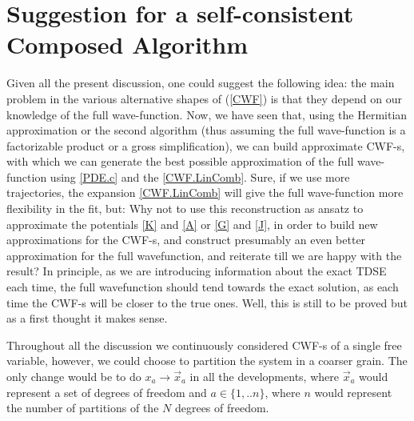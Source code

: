 \documentclass[11pt, a4paper]{article} %
\begin{document}
\newpage
\section{Suggestion for a self-consistent Composed Algorithm}
Given all the present discussion, one could suggest the following idea: the main problem in the various alternative shapes of (\ref{CWF}) is that they depend on our knowledge of the full wave-function. Now, we have seen that, using the Hermitian approximation or the second algorithm (thus assuming the full wave-function is a factorizable product or a gross simplification), we can build approximate CWF-s, with which we can generate the best possible approximation of the full wave-function using \ref{PDE.c} and the \ref{CWF.LinComb}. Sure, if we use more trajectories, the expansion \ref{CWF.LinComb} will give the full wave-function more flexibility in the fit, but: Why not to use this reconstruction as ansatz to approximate the potentials \ref{K} and \ref{A} or \ref{G} and \ref{J}, in order to build new approximations for the CWF-s, and construct presumably an even better approximation for the full wavefunction, and reiterate till we are happy with the result? In principle, as we are introducing information about the exact TDSE each time, the full wavefunction should tend towards the exact solution, as each time the CWF-s will be closer to the true ones. Well, this is still to be proved but as a first thought it makes sense. 

Throughout all the discussion we continuously considered CWF-s of a single free variable, however, we could choose to partition the system in a coarser grain. The only change would be to do $x_a\longrightarrow \vec{x}_a$ in all the developments, where $\vec{x}_a$ would represent a set of degrees of freedom and $a\in \{1,..n\}$, where $n$ would represent the number of partitions of the $N$ degrees of freedom.
\end{document}
